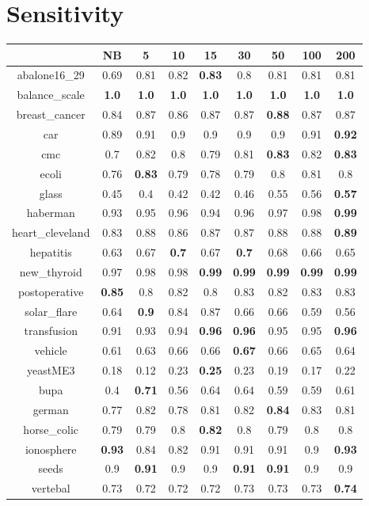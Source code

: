 \documentclass{article}%
\begin{document}
%
\section*{Sensitivity}%
\begin{tabular}{c|cccccccc}%
\hline%
&NB&5&10&15&30&50&100&200\\%
\hline%
abalone16\_29&0.69&0.81&0.82&\textbf{0.83}&0.8&0.81&0.81&0.81\\%
\hline%
balance\_scale&\textbf{1.0}&\textbf{1.0}&\textbf{1.0}&\textbf{1.0}&\textbf{1.0}&\textbf{1.0}&\textbf{1.0}&\textbf{1.0}\\%
\hline%
breast\_cancer&0.84&0.87&0.86&0.87&0.87&\textbf{0.88}&0.87&0.87\\%
\hline%
car&0.89&0.91&0.9&0.9&0.9&0.9&0.91&\textbf{0.92}\\%
\hline%
cmc&0.7&0.82&0.8&0.79&0.81&\textbf{0.83}&0.82&\textbf{0.83}\\%
\hline%
ecoli&0.76&\textbf{0.83}&0.79&0.78&0.79&0.8&0.81&0.8\\%
\hline%
glass&0.45&0.4&0.42&0.42&0.46&0.55&0.56&\textbf{0.57}\\%
\hline%
haberman&0.93&0.95&0.96&0.94&0.96&0.97&0.98&\textbf{0.99}\\%
\hline%
heart\_cleveland&0.83&0.88&0.86&0.87&0.87&0.88&0.88&\textbf{0.89}\\%
\hline%
hepatitis&0.63&0.67&\textbf{0.7}&0.67&\textbf{0.7}&0.68&0.66&0.65\\%
\hline%
new\_thyroid&0.97&0.98&0.98&\textbf{0.99}&\textbf{0.99}&\textbf{0.99}&\textbf{0.99}&\textbf{0.99}\\%
\hline%
postoperative&\textbf{0.85}&0.8&0.82&0.8&0.83&0.82&0.83&0.83\\%
\hline%
solar\_flare&0.64&\textbf{0.9}&0.84&0.87&0.66&0.66&0.59&0.56\\%
\hline%
transfusion&0.91&0.93&0.94&\textbf{0.96}&\textbf{0.96}&0.95&0.95&\textbf{0.96}\\%
\hline%
vehicle&0.61&0.63&0.66&0.66&\textbf{0.67}&0.66&0.65&0.64\\%
\hline%
yeastME3&0.18&0.12&0.23&\textbf{0.25}&0.23&0.19&0.17&0.22\\%
\hline%
bupa&0.4&\textbf{0.71}&0.56&0.64&0.64&0.59&0.59&0.61\\%
\hline%
german&0.77&0.82&0.78&0.81&0.82&\textbf{0.84}&0.83&0.81\\%
\hline%
horse\_colic&0.79&0.79&0.8&\textbf{0.82}&0.8&0.79&0.8&0.8\\%
\hline%
ionosphere&\textbf{0.93}&0.84&0.82&0.91&0.91&0.91&0.9&\textbf{0.93}\\%
\hline%
seeds&0.9&\textbf{0.91}&0.9&0.9&\textbf{0.91}&\textbf{0.91}&0.9&0.9\\%
\hline%
vertebal&0.73&0.72&0.72&0.72&0.73&0.73&0.73&\textbf{0.74}\\%
\hline%
\end{tabular}
\end{document}
